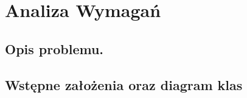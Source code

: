 \section{Analiza Wymagań}
\subsection{Opis problemu.}


\subsection{Wstępne założenia oraz diagram klas}


